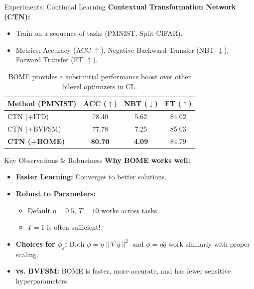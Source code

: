 \documentclass{beamer}
\begin{document}
\begin{frame}{Experiments: Continual Learning}
    \textbf{Contextual Transformation Network (CTN):}
    \begin{itemize}
        \item Train on a sequence of tasks (PMNIST, Split CIFAR).
        \item Metrics: Accuracy (ACC $\uparrow$), Negative Backward Transfer (NBT $\downarrow$), Forward Transfer (FT $\uparrow$).
    \end{itemize}
    \begin{table}
        \centering
        \begin{tabular}{l|c|c|c}
            \hline
            \textbf{Method (PMNIST)} & ACC ($\uparrow$) & NBT ($\downarrow$) & FT ($\uparrow$) \\
            \hline
            CTN (+ITD) & 78.40 & 5.62 & 84.02 \\
            CTN (+BVFSM) & 77.78 & 7.25 & 85.03 \\
            \textbf{CTN (+BOME)} & \textbf{80.70} & \textbf{4.09} & 84.79 \\
            \hline
        \end{tabular}
        \caption{BOME provides a substantial performance boost over other bilevel optimizers in CL.}
    \end{table}
\end{frame}

\begin{frame}{Key Observations \& Robustness}
            \textbf{Why BOME works well:}
            \begin{itemize}
                \item \textbf{Faster Learning:} Converges to better solutions.
                \item \textbf{Robust to Parameters:}
                \begin{itemize}
                    \item Default $\eta = 0.5$, $T=10$ works across tasks.
                    \item $T=1$ is often sufficient!
                \end{itemize}
                \item \textbf{Choices for $\phi_k$:} Both $\phi = \eta \|\nabla \hat{q}\|^2$ and $\phi = \eta \hat{q}$ work similarly with proper scaling.
                \item \textbf{vs. BVFSM:} BOME is faster, more accurate, and has fewer sensitive hyperparameters.
            \end{itemize}
 
\end{frame}
\end{document}
